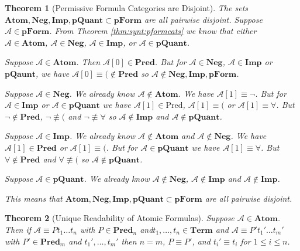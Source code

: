 \documentclass[12pt]{article}
\theoremstyle{break}
\theoremstyle{break}
\newtheorem{theorem}{Theorem}[section]
\theoremstyle{break}
\theoremstyle{break}
\theoremstyle{break}
\newtheorem{informal definition}[definition]{Informal Definition}
\newcommand{\mc}[1]{\mathcal{#1}}
\begin{document}
\begin{theorem}[Permissive Formula Categories are Disjoint]
\label{thm:read:pformcatdisjoint}
The sets $\textbf{Atom}, \textbf{Neg}, \textbf{Imp}, \textbf{pQuant}\subset \textbf{pForm}$ are all pairwise disjoint.
Suppose $\mc{A}\in\textbf{pForm}$.
From Theorem \ref{thm:synt:pformcats} we know that either $\mc{A}\in\textbf{Atom}$, $\mc{A}\in\textbf{Neg}$, $\mc{A}\in\textbf{Imp}$, or $\mc{A}\in\textbf{pQuant}$.

Suppose $\mc{A}\in\textbf{Atom}$. Then $\mc{A}[0] \in \textbf{Pred}$. But for $\mc{A}\in \textbf{Neg}$, $\mc{A}\in\textbf{Imp}$ or $\textbf{pQaunt}$, we have $\mc{A}[0] \equiv ( \not \in \textbf{Pred}$ so $\mc{A} \not \in \textbf{Neg}, \textbf{Imp}, \textbf{pForm}$.

Suppose $\mc{A}\in \textbf{Neg}$.
We already know $\mc{A}\not \in \textbf{Atom}$.
We have $\mc{A}[1] \equiv \lnot$.
But for $\mc{A}\in\textbf{Imp}$ or $\mc{A}\in\textbf{pQuant}$ we have $\mc{A}[1]\in \text{Pred}$, $\mc{A}[1]\equiv ($ or $\mc{A}[1]\equiv \forall$.
But $\lnot \not \in \textbf{Pred}$, $\lnot \not \equiv ($ and $\lnot\not \equiv \forall$ so $\mc{A}\not \in \textbf{Imp}$ and $\mc{A} \not \in \textbf{pQuant}$.

Suppose $\mc{A} \in \textbf{Imp}$.
We already know $\mc{A} \not \in \textbf{Atom}$ and $\mc{A} \not \in \textbf{Neg}$.
We have $\mc{A}[1] \in \textbf{Pred}$ or $\mc{A}[1]\equiv ($.
But for $\mc{A} \in \textbf{pQuant}$ we have $\mc{A}[1] \equiv \forall$.
But $\forall \not \in \textbf{Pred}$ and $\forall \not \equiv ($ so $\mc{A} \not \in \textbf{pQuant}$.

Suppose $\mc{A}\in\textbf{pQuant}$.
We already know $\mc{A} \not \in \textbf{Neg}$, $\mc{A}\not \in \textbf{Imp}$ and $\mc{A} \not \in \textbf{Imp}$.

This means that $\textbf{Atom}, \textbf{Neg}, \textbf{Imp}, \textbf{pQuant}\subset \textbf{pForm}$ are all pairwise disjoint.
\end{theorem}

\begin{theorem}[Unique Readability of Atomic Formulas]
Suppose $\mc{A} \in \textbf{Atom}$.
Then if $\mc{A}\equiv P t_1\ldots t_n$ with $P\in\textbf{Pred}_n$ and$t_1,\ldots, t_n\in\textbf{Term}$ and $\mc{A}\equiv P't_1'\ldots t_m'$ with $P'\in\textbf{Pred}_m$ and $t_1', \ldots, t_m'$ then $n=m$, $P\equiv P'$, and $t_i' \equiv t_i$ for $1\le i \le n$.
\end{theorem}
\end{document}
